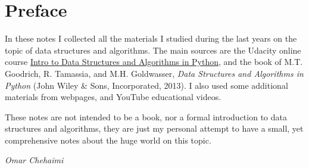 
\chapter*{Preface}

In these notes I collected all the materials I studied during the last years on the topic of data structures and algorithms. The main sources are the Udacity online course \href{https://www.udacity.com/course/data-structures-and-algorithms-in-python--ud513}{Intro to Data Structures and Algorithms in Python}, and the book of M.T. Goodrich, R. Tamassia, and M.H. Goldwasser, \textit{Data Structures and Algorithms in Python} (John Wiley \& Sons, Incorporated, 2013). I also used some additional materials from webpages, and YouTube educational videos.

These notes are not intended to be a book, nor a formal introduction to data structures and algorithms, they are just my personal attempt to have a small, yet comprehensive notes about the huge world on this topic.

 
\begin{flushright}
	\textit{Omar Chehaimi}
\end{flushright}

\hfill

\vfill

\noindent
\textsf{}

\noindent
{}\,